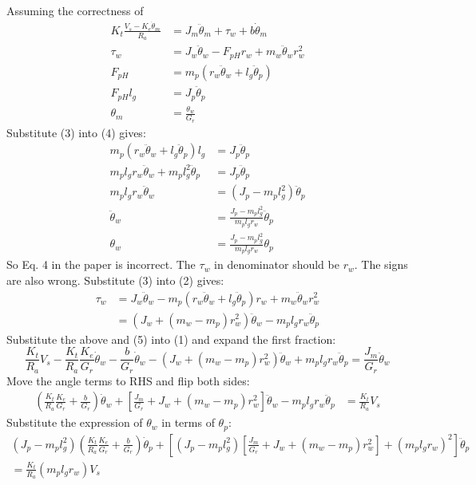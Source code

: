 \documentclass{article}
\begin{document}
Assuming the correctness of
\begin{align}
K_t \frac{V_s - K_e \dot{\theta}_m}{R_a} &= J_m \ddot{\theta}_m + \tau_w + b \dot{\theta}_m \\
\tau_w &= J_w \ddot{\theta}_w - F_{pH} r_w + m_w \ddot{\theta}_w r_w^2 \\
F_{pH} &= m_p (r_w \ddot{\theta}_w + l_g \ddot{\theta}_p) \\
F_{pH} l_g &= J_p \ddot{\theta}_p \\
\theta_m &= \frac{\theta_w}{G_r}
\end{align}
Substitute (3) into (4) gives:
\begin{align*}
m_p (r_w \ddot{\theta}_w + l_g \ddot{\theta}_p) l_g &= J_p \ddot{\theta}_p \\
m_p l_g r_w \ddot{\theta}_w + m_p l_g^2 \ddot{\theta}_p &= J_p \ddot{\theta}_p \\
m_p l_g r_w \ddot{\theta}_w &= (J_p - m_p l_g^2) \ddot{\theta}_p \\
\ddot{\theta}_w &= \frac{J_p - m_p l_g^2}{m_p l_g r_w} \ddot{\theta}_p \\
\theta_w &= \frac{J_p - m_p l_g^2}{m_p l_g r_w} \theta_p
\end{align*}
So Eq. 4 in the paper is incorrect. The \(\tau_w\) in denominator should be \(r_w\). The signs are also wrong.
Substitute (3) into (2) gives:
\begin{align*}
\tau_w &= J_w \ddot{\theta}_w - m_p (r_w \ddot{\theta}_w + l_g \ddot{\theta}_p) r_w + m_w \ddot{\theta}_w r_w^2 \\
&= (J_w + (m_w - m_p) r_w^2) \ddot{\theta}_w - m_p l_g r_w \ddot{\theta}_p
\end{align*}
Substitute the above and (5) into (1) and expand the first fraction:
\[
\frac{K_t}{R_a} V_s - \frac{K_t}{R_a} \frac{K_e}{G_r} \dot{\theta}_w - \frac{b}{G_r} \dot{\theta}_w - (J_w + (m_w - m_p) r_w^2) \ddot{\theta}_w + m_p l_g r_w \ddot{\theta}_p = \frac{J_m}{G_r} \ddot{\theta}_w
\]
Move the angle terms to RHS and flip both sides:
\begin{align*}
\left( \frac{K_t}{R_a} \frac{K_e}{G_r} + \frac{b}{G_r} \right) \dot{\theta}_w + \left[ \frac{J_m}{G_r} + J_w + (m_w - m_p) r_w^2 \right] \ddot{\theta}_w - m_p l_g r_w \ddot{\theta}_p &= \frac{K_t}{R_a} V_s
\end{align*}
Substitute the expression of \(\theta_w\) in terms of \(\theta_p\):
\begin{align*}
(J_p - m_p l_g^2) \left( \frac{K_t}{R_a} \frac{K_e}{G_r} + \frac{b}{G_r} \right) \dot{\theta}_p + \left[ (J_p - m_p l_g^2) \left[ \frac{J_m}{G_r} + J_w + (m_w - m_p) r_w^2 \right] + (m_p l_g r_w)^2 \right] \ddot{\theta}_p \\= \frac{K_t}{R_a} (m_p l_g r_w) V_s
\end{align*}
\end{document}
